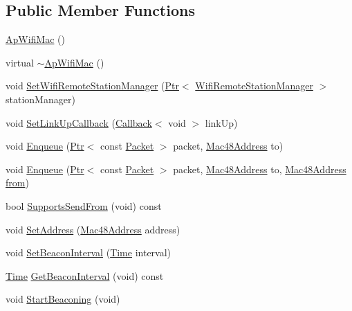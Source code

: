 \subsection*{Public Member Functions}
\begin{DoxyCompactItemize}
\item 
\hyperlink{classns3_1_1ApWifiMac_a6fda79b577eb79eaabceb05a36e27b44}{Ap\+Wifi\+Mac} ()
\item 
virtual \hyperlink{classns3_1_1ApWifiMac_a3df10fd221c6bb1ed3f64de34ec79074}{$\sim$\+Ap\+Wifi\+Mac} ()
\item 
void \hyperlink{classns3_1_1ApWifiMac_ae3c3d4faab6d3a50f7a776cc493a5465}{Set\+Wifi\+Remote\+Station\+Manager} (\hyperlink{classns3_1_1Ptr}{Ptr}$<$ \hyperlink{classns3_1_1WifiRemoteStationManager}{Wifi\+Remote\+Station\+Manager} $>$ station\+Manager)
\item 
void \hyperlink{classns3_1_1ApWifiMac_a81ca5583755bed83abd5e011be755cd4}{Set\+Link\+Up\+Callback} (\hyperlink{classns3_1_1Callback}{Callback}$<$ void $>$ link\+Up)
\item 
void \hyperlink{classns3_1_1ApWifiMac_a0675813a47439c500d3c7770301d1ad6}{Enqueue} (\hyperlink{classns3_1_1Ptr}{Ptr}$<$ const \hyperlink{classns3_1_1Packet}{Packet} $>$ packet, \hyperlink{classns3_1_1Mac48Address}{Mac48\+Address} to)
\item 
void \hyperlink{classns3_1_1ApWifiMac_a794a21315279c5b464be5af21f3352cb}{Enqueue} (\hyperlink{classns3_1_1Ptr}{Ptr}$<$ const \hyperlink{classns3_1_1Packet}{Packet} $>$ packet, \hyperlink{classns3_1_1Mac48Address}{Mac48\+Address} to, \hyperlink{classns3_1_1Mac48Address}{Mac48\+Address} \hyperlink{lte__amc_8m_a1b4c81ff74eb1a626b5ade44c81004b3}{from})
\item 
bool \hyperlink{classns3_1_1ApWifiMac_ad2adbeff7d0d13c68c88757da68e6478}{Supports\+Send\+From} (void) const 
\item 
void \hyperlink{classns3_1_1ApWifiMac_aafe8da38f3bff4de51d264e1a193a1f2}{Set\+Address} (\hyperlink{classns3_1_1Mac48Address}{Mac48\+Address} address)
\item 
void \hyperlink{classns3_1_1ApWifiMac_a164d67e99b6afd7cdf95c1ec5a5b40e4}{Set\+Beacon\+Interval} (\hyperlink{classns3_1_1Time}{Time} interval)
\item 
\hyperlink{classns3_1_1Time}{Time} \hyperlink{classns3_1_1ApWifiMac_adaa4b445c0b2a4afa016dd4df1b4b4eb}{Get\+Beacon\+Interval} (void) const 
\item 
void \hyperlink{classns3_1_1ApWifiMac_ae26ad921c3064d5e174c27860c41dfdd}{Start\+Beaconing} (void)

\end{DoxyCompactItemize}
